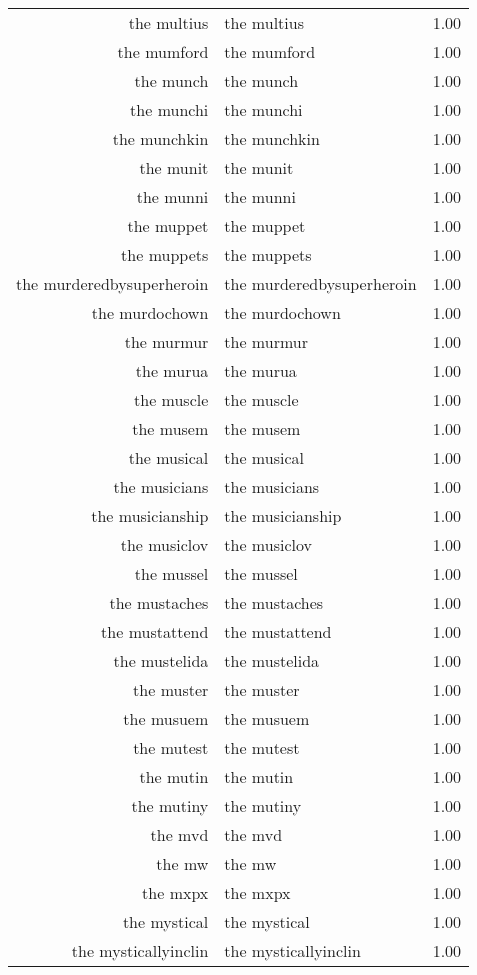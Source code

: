 \begin{table}[ht]
\begin{tabular}{rlr}
  the multius & the multius & 1.00 \\ 
  the mumford & the mumford & 1.00 \\ 
  the munch & the munch & 1.00 \\ 
  the munchi & the munchi & 1.00 \\ 
  the munchkin & the munchkin & 1.00 \\ 
  the munit & the munit & 1.00 \\ 
  the munni & the munni & 1.00 \\ 
  the muppet & the muppet & 1.00 \\ 
  the muppets & the muppets & 1.00 \\ 
  the murderedbysuperheroin & the murderedbysuperheroin & 1.00 \\ 
  the murdochown & the murdochown & 1.00 \\ 
  the murmur & the murmur & 1.00 \\ 
  the murua & the murua & 1.00 \\ 
  the muscle & the muscle & 1.00 \\ 
  the musem & the musem & 1.00 \\ 
  the musical & the musical & 1.00 \\ 
  the musicians & the musicians & 1.00 \\ 
  the musicianship & the musicianship & 1.00 \\ 
  the musiclov & the musiclov & 1.00 \\ 
  the mussel & the mussel & 1.00 \\ 
  the mustaches & the mustaches & 1.00 \\ 
  the mustattend & the mustattend & 1.00 \\ 
  the mustelida & the mustelida & 1.00 \\ 
  the muster & the muster & 1.00 \\ 
  the musuem & the musuem & 1.00 \\ 
  the mutest & the mutest & 1.00 \\ 
  the mutin & the mutin & 1.00 \\ 
  the mutiny & the mutiny & 1.00 \\ 
  the mvd & the mvd & 1.00 \\ 
  the mw & the mw & 1.00 \\ 
  the mxpx & the mxpx & 1.00 \\ 
  the mystical & the mystical & 1.00 \\ 
  the mysticallyinclin & the mysticallyinclin & 1.00 \\ 

\end{tabular}
\end{table}
